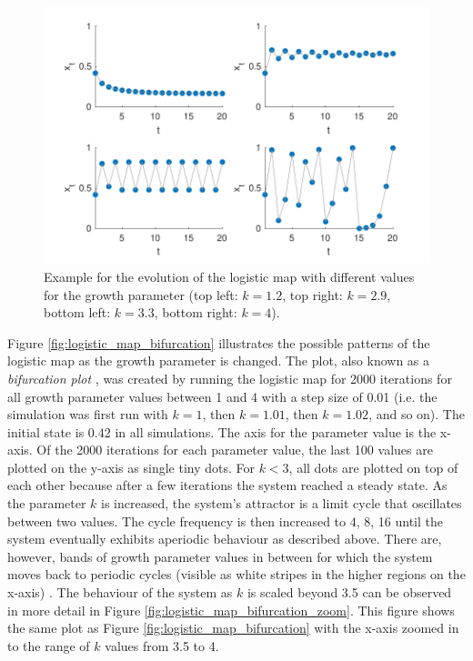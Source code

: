 \begin{figure}
\includegraphics[width=\textwidth]{figures/ch3/more_logistic_maps.pdf}
\caption[Example for the evolution of the logistic map with different values for the growth parameter.]{Example for the evolution of the logistic map with different values for the growth parameter (top left: $k = 1.2$, top right: $k = 2.9$, bottom left: $k = 3.3$, bottom right: $k = 4$).}
\label{fig:more_logistic_maps}
\end{figure}

Figure \ref{fig:logistic_map_bifurcation} illustrates the possible patterns of the logistic map as the growth parameter is changed. The plot, also known as a \emph{bifurcation plot} \citep{Feigenbaum1978}, was created by running the logistic map for 2000 iterations for all growth parameter values between 1 and 4 with a step size of 0.01 (i.e. the simulation was first run with $k = 1$, then $k = 1.01$, then $k = 1.02$, and so on). The initial state is $0.42$ in all simulations. The axis for the parameter value is the x-axis. Of the 2000 iterations for each parameter value, the last 100 values are plotted on the y-axis as single tiny dots. For $k < 3$, all dots are plotted on top of each other because after a few iterations the system reached a steady state. As the parameter $k$ is increased, the system’s attractor is a limit cycle that oscillates between two values. The cycle frequency is then increased to 4, 8, 16 until the system eventually exhibits aperiodic behaviour as described above. There are, however, bands of growth parameter values in between for which the system moves back to periodic cycles (visible as white stripes in the higher regions on the x-axis) \citep{KaplanGlass1995, Spivey2007}. The behaviour of the system as $k$ is scaled beyond 3.5 can be observed in more detail in Figure \ref{fig:logistic_map_bifurcation_zoom}. This figure shows the same plot as Figure \ref{fig:logistic_map_bifurcation} with the x-axis zoomed in to the range of $k$ values from 3.5 to 4.

